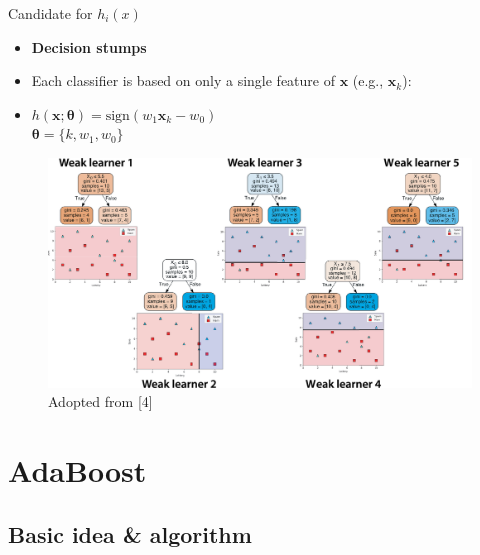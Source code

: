 \documentclass[serif, aspectratio=169]{beamer}
\begin{document}
\begin{frame}{Candidate for $h_i(x)$}
    \begin{itemize}
        \itemsep1em
        \justifying
        \item \textbf{Decision stumps}
        \item Each classifier is based on only a single feature of $\boldsymbol{x}$ (e.g., $\boldsymbol{x}_k$):
        \item[] \begin{center}
            $h(\boldsymbol{x};\boldsymbol{\theta})=\text{sign}(w_1\boldsymbol{x}_k-w_0)$ \\ \medskip
            $\boldsymbol{\theta}=\{k,w_1,w_0\}$
        \end{center} 
    \end{itemize}
    \endminipage
    \hfill
    \begin{figure}[!htb]
        \includegraphics[width=\linewidth]{pic/decisionstumps.png}
        {\scriptsize Adopted from [4]}
    \end{figure}
    \endminipage
\end{frame}

\section{AdaBoost}

\subsection{Basic idea \& algorithm}
\end{document}
